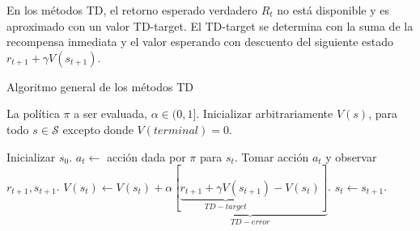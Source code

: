 En los métodos TD, el retorno esperado verdadero $R_t$ no está disponible
y es aproximado con un valor TD-target. El TD-target se determina con la suma de la recompensa inmediata y el valor esperando con descuento del 
siguiente estado $r_{t+1} + \gamma V(s_{t+1})$. 

\begin{algorithm}[H]
  	\caption{Algoritmo general de los métodos TD}
	\label{alg:TD-algo}
  \begin{algorithmic}[1]
  \REQUIRE La política $\pi$ a ser evaluada, $\alpha \in (0,1]$.
  \STATE Inicializar arbitrariamente $V(s)$, para todo $s\in \mathcal{S}$ excepto donde $V(terminal) = 0$.
  
    \STATE Inicializar $s_0$.
    \STATE $a_{t} \leftarrow$ acción dada por $\pi$ para $s_t$.
    \STATE Tomar acción $a_t$ y observar $r_{t+1}, s_{t+1}$.
    \STATE $V(s_t) \leftarrow V(s_t) + \alpha\underbrace{[\underbrace{r_{t+1} + \gamma V(s_{t+1})}_{TD-target} - V(s_t)]}_{TD-error}$.
    \STATE $s_t \leftarrow s_{t+1}$.
    \ENDFOR
  \ENDFOR
  \end{algorithmic}
\end{algorithm}



	
	
	
	

